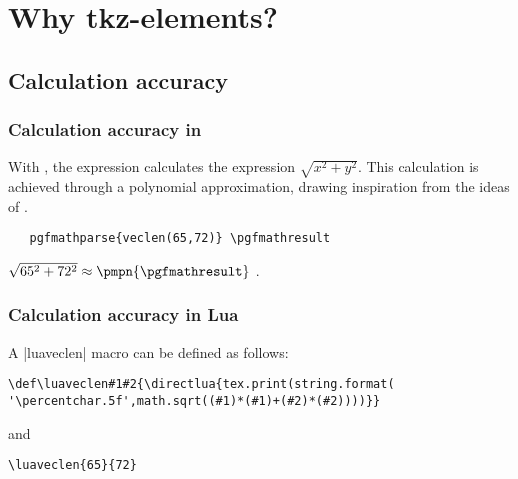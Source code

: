 \newpage
\section{Why tkz-elements?} %
\label{sec:why_tkz_elements}

\subsection{Calculation accuracy} %
\label{sub:calculation_accuracy}

\subsubsection{Calculation accuracy in \TIKZ} %
\label{ssub:calculation_accuracy_in_tikz}

With \TIKZ,  the expression  calculates the expression $\sqrt{x^2+y^2}$.
This calculation is achieved through a polynomial approximation, drawing inspiration from the ideas  of .

  
\begin{mybox}{}
\begin{Verbatim}
   pgfmathparse{veclen(65,72)} \pgfmathresult
\end{Verbatim}
\end{mybox}

 \tkzHand $\sqrt{65^2+72^2} \approx \pmpn{\pgfmathresult} $ \tkzRBomb.

\subsubsection{Calculation accuracy in Lua} %
\label{ssub:calculation_accuracy_in_lua}

A |luaveclen| macro can be defined as follows:

\begin{mybox}{}
\begin{Verbatim}
\def\luaveclen#1#2{\directlua{tex.print(string.format(
'\percentchar.5f',math.sqrt((#1)*(#1)+(#2)*(#2))))}}
\end{Verbatim}
\end{mybox}

and

\begin{mybox}
\begin{Verbatim}
\luaveclen{65}{72}
\end{Verbatim}
\end{mybox}

